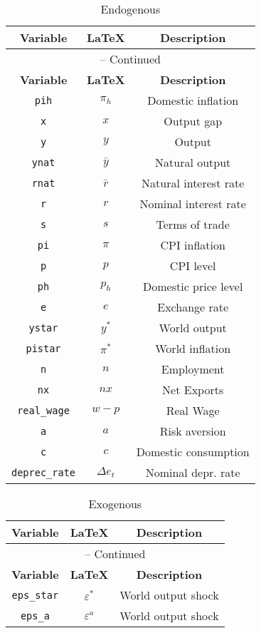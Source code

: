\begin{center}
\begin{longtable}{ccc}
\caption{Endogenous}\\%
\hline%
\multicolumn{1}{c}{\textbf{Variable}} &
\multicolumn{1}{c}{\textbf{\LaTeX}} &
\multicolumn{1}{c}{\textbf{Description}}\\%
\hline\hline%
\endfirsthead
\multicolumn{3}{c}{{\tablename} \thetable{} -- Continued}\\%
\hline%
\multicolumn{1}{c}{\textbf{Variable}} &
\multicolumn{1}{c}{\textbf{\LaTeX}} &
\multicolumn{1}{c}{\textbf{Description}}\\%
\hline\hline%
\endhead
\texttt{pih} & ${\pi_h}$ & Domestic inflation\\
\texttt{x} & $x$ & Output gap\\
\texttt{y} & $y$ & Output\\
\texttt{ynat} & ${\bar y}$ & Natural output\\
\texttt{rnat} & ${\bar r}$ & Natural interest rate\\
\texttt{r} & $r$ & Nominal interest rate\\
\texttt{s} & $s$ & Terms of trade\\
\texttt{pi} & ${\pi}$ & CPI inflation\\
\texttt{p} & $p$ & CPI level\\
\texttt{ph} & ${p_h}$ & Domestic price level\\
\texttt{e} & $e$ & Exchange rate\\
\texttt{ystar} & ${y^*}$ & World output\\
\texttt{pistar} & ${\pi^{*}}$ & World inflation\\
\texttt{n} & ${n}$ & Employment\\
\texttt{nx} & ${nx}$ & Net Exports\\
\texttt{real\_wage} & ${w-p}$ & Real Wage\\
\texttt{a} & $a$ & Risk aversion\\
\texttt{c} & $c$ & Domestic consumption\\
\texttt{deprec\_rate} & $\Delta e_t$ & Nominal depr. rate\\
\hline%
\end{longtable}
\end{center}
\begin{center}
\begin{longtable}{ccc}
\caption{Exogenous}\\%
\hline%
\multicolumn{1}{c}{\textbf{Variable}} &
\multicolumn{1}{c}{\textbf{\LaTeX}} &
\multicolumn{1}{c}{\textbf{Description}}\\%
\hline\hline%
\endfirsthead
\multicolumn{3}{c}{{\tablename} \thetable{} -- Continued}\\%
\hline%
\multicolumn{1}{c}{\textbf{Variable}} &
\multicolumn{1}{c}{\textbf{\LaTeX}} &
\multicolumn{1}{c}{\textbf{Description}}\\%
\hline\hline%
\endhead
\texttt{eps\_star} & ${\varepsilon^{*}}$ & World output shock\\
\texttt{eps\_a} & ${\varepsilon^{a}}$ & World output shock\\
\hline%
\end{longtable}
\end{center}
